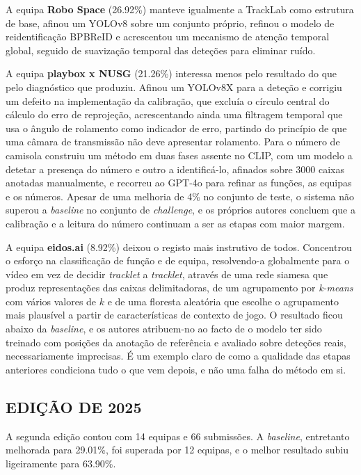 A equipa \textbf{Robo Space} (26.92\%) manteve igualmente a TrackLab como estrutura de
base, afinou um YOLOv8 sobre um conjunto próprio, refinou o modelo de reidentificação
BPBReID e acrescentou um mecanismo de atenção temporal global, seguido de suavização
temporal das deteções para eliminar ruído.

A equipa \textbf{playbox x NUSG} (21.26\%) interessa menos pelo resultado do que pelo
diagnóstico que produziu. Afinou um YOLOv8X para a deteção e corrigiu um defeito na
implementação da calibração, que excluía o círculo central do cálculo do erro de
reprojeção, acrescentando ainda uma filtragem temporal que usa o ângulo de rolamento como
indicador de erro, partindo do princípio de que uma câmara de transmissão não deve
apresentar rolamento. Para o número de camisola construiu um método em duas fases assente
no CLIP, com um modelo a detetar a presença do número e outro a identificá-lo, afinados
sobre 3000 caixas anotadas manualmente, e recorreu ao GPT-4o para refinar as funções, as
equipas e os números. Apesar de uma melhoria de 4\% no conjunto de teste, o sistema não
superou a \emph{baseline} no conjunto de \emph{challenge}, e os próprios autores concluem
que a calibração e a leitura do número continuam a ser as etapas com maior margem.

A equipa \textbf{eidos.ai} (8.92\%) deixou o registo mais instrutivo de todos. Concentrou
o esforço na classificação de função e de equipa, resolvendo-a globalmente para o vídeo em
vez de decidir \emph{tracklet} a \emph{tracklet}, através de uma rede siamesa que produz
representações das caixas delimitadoras, de um agrupamento por \emph{k-means} com vários
valores de $k$ e de uma floresta aleatória que escolhe o agrupamento mais plausível a
partir de características de contexto de jogo. O resultado ficou abaixo da \emph{baseline},
e os autores atribuem-no ao facto de o modelo ter sido treinado com posições da anotação de
referência e avaliado sobre deteções reais, necessariamente imprecisas. É um exemplo claro
de como a qualidade das etapas anteriores condiciona tudo o que vem depois, e não uma falha
do método em si.

\subsection{EDIÇÃO DE 2025}

A segunda edição contou com 14 equipas e 66 submissões. A \emph{baseline}, entretanto
melhorada para 29.01\%, foi superada por 12 equipas, e o melhor resultado subiu ligeiramente
para 63.90\%.

